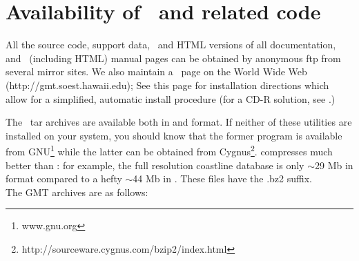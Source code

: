 %
%
\chapter{Availability of \gmt\ and related code}
\thispagestyle{headings}

All the source code, support data, \PS\,
and HTML versions of all documentation, and \UNIX\
(including HTML) manual pages can be obtained by anonymous
ftp from several mirror sites.  We also maintain a \GMT\
page on the World Wide Web (http://gmt.soest.hawaii.edu);
See this page for installation directions 
which allow for a simplified, automatic install procedure
(for a CD-R solution, see .)

The \GMT\ tar archives are available both in \progname{gzip}
and  format.  If neither of these utilities
are installed on your system, you should know that the former
program is available from GNU\footnote{www.gnu.org} while the
latter can be obtained from Cygnus\footnote{http://sourceware.cygnus.com/bzip2/index.html}.
 compresses much better than :
for example, the full resolution coastline database is only
$\sim$29 Mb in \progname{bzip2} format compared to a hefty
$\sim$44 Mb in \progname{gzip}.  These files have the
.bz2 suffix. \\

The GMT archives are as follows:

